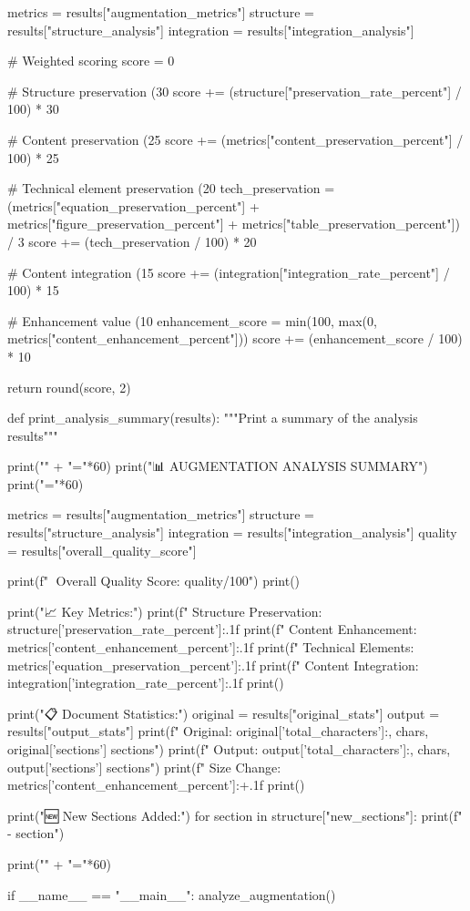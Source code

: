     metrics = results["augmentation_metrics"]
    structure = results["structure_analysis"]
    integration = results["integration_analysis"]
    
    # Weighted scoring
    score = 0
    
    # Structure preservation (30%
    score += (structure["preservation_rate_percent"] / 100) * 30
    
    # Content preservation (25%
    score += (metrics["content_preservation_percent"] / 100) * 25
    
    # Technical element preservation (20%
    tech_preservation = (metrics["equation_preservation_percent"] + 
                        metrics["figure_preservation_percent"] + 
                        metrics["table_preservation_percent"]) / 3
    score += (tech_preservation / 100) * 20
    
    # Content integration (15%
    score += (integration["integration_rate_percent"] / 100) * 15
    
    # Enhancement value (10%
    enhancement_score = min(100, max(0, metrics["content_enhancement_percent"]))
    score += (enhancement_score / 100) * 10
    
    return round(score, 2)

def print_analysis_summary(results):
    """Print a summary of the analysis results"""
    
    print("\n" + "="*60)
    print("📊 AUGMENTATION ANALYSIS SUMMARY")
    print("="*60)
    
    metrics = results["augmentation_metrics"]
    structure = results["structure_analysis"]
    integration = results["integration_analysis"]
    quality = results["overall_quality_score"]
    
    print(f"🎯 Overall Quality Score: {quality}/100")
    print()
    
    print("📈 Key Metrics:")
    print(f"  Structure Preservation: {structure['preservation_rate_percent']:.1f}%
    print(f"  Content Enhancement: {metrics['content_enhancement_percent']:.1f}%
    print(f"  Technical Elements: {metrics['equation_preservation_percent']:.1f}%
    print(f"  Content Integration: {integration['integration_rate_percent']:.1f}%
    print()
    
    print("📋 Document Statistics:")
    original = results["original_stats"]
    output = results["output_stats"]
    print(f"  Original: {original['total_characters']:,} chars, {original['sections']} sections")
    print(f"  Output: {output['total_characters']:,} chars, {output['sections']} sections")
    print(f"  Size Change: {metrics['content_enhancement_percent']:+.1f}%
    print()
    
    print("🆕 New Sections Added:")
    for section in structure["new_sections"]:
        print(f"  - {section}")
    
    print("\n" + "="*60)

if __name__ == "__main__":
    analyze_augmentation()